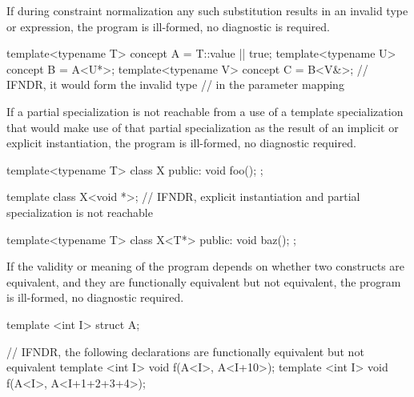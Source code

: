 
\pnum
If during constraint normalization
any such substitution results in an invalid type or expression,
the program is ill-formed, no diagnostic is required.

\pnum
\begin{example}
\begin{codeblock}
template<typename T> concept A = T::value || true;
template<typename U> concept B = A<U*>;
template<typename V> concept C = B<V&>;         // IFNDR, it would form the invalid type 
                                                // in the parameter mapping
\end{codeblock}
\end{example}


\pnum
If a partial specialization
is not reachable from a use of a template specialization
that would make use of that partial specialization
as the result of an implicit or explicit instantiation,
the program is ill-formed, no diagnostic required.

\pnum
\begin{example}
\begin{codeblock}
template<typename T> class X{
public:
  void foo(){};
};

template class X<void *>;       // IFNDR, explicit instantiation and partial specialization is not reachable

template<typename T> class X<T*>{
public:
  void baz();
};
\end{codeblock}
\end{example}


\pnum
If the validity or meaning of the program
depends on whether two constructs are equivalent,
and they are functionally equivalent but not equivalent,
the program is ill-formed, no diagnostic required.

\pnum
\begin{example}
\begin{codeblock}
template <int I>
struct A{};

// IFNDR, the following declarations are functionally equivalent but not equivalent
template <int I> void f(A<I>, A<I+10>);
template <int I> void f(A<I>, A<I+1+2+3+4>);
\end{codeblock}
\end{example}

